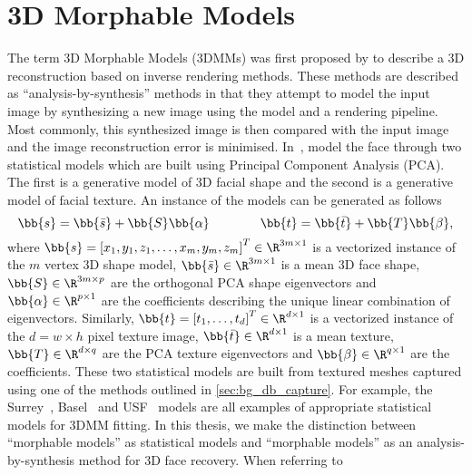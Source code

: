 \section{3D Morphable Models}\label{sec:bg_3dmm}
The term 3D Morphable Models (3DMMs) was first proposed by
\citet{volker1999morphable} to describe a 3D reconstruction based on inverse
rendering methods. These methods are described as ``analysis-by-synthesis''
methods in that they attempt to model the input image by synthesizing a new
image using the model and a rendering pipeline. Most commonly, this synthesized
image is then compared with the input image and the image reconstruction error
is minimised. In~\cite{volker1999morphable}, 
model the face through two statistical models which are built using
Principal Component Analysis (PCA). The first is a generative model of 3D
facial shape and the second is a generative model of facial texture.
An instance of the models can be generated as follows
\begin{equation}\label{eg:bg_3dmm_pca}
	\bb{s} = \bb{\bar{s}} + \bb{S} \bb{\alpha} \qquad \qquad \bb{t} = \bb{\bar{t}} + \bb{T} \bb{\beta},
\end{equation}
where
$\bb{s} = {[x_1, y_1, z_1, \ldots, x_m, y_m, z_m]}^T \in \R^{3m \times 1}$ is
a vectorized instance of the $m$ vertex 3D shape model,
$\bb{\bar{s}} \in \R^{3m \times 1}$ is a mean 3D face shape,
$\bb{S} \in \R^{3m \times p}$ are the orthogonal PCA shape eigenvectors and
$\bb{\alpha} \in \R^{p \times 1}$ are the coefficients describing the unique
linear combination of eigenvectors. Similarly,
$\bb{t} = {[t_1, \ldots, t_d]}^T \in \R^{d \times 1}$ is
a vectorized instance of the $d = w \times h$ pixel texture image,
$\bb{\bar{t}} \in \R^{d \times 1}$ is a mean texture,
$\bb{T} \in \R^{d \times q}$ are the PCA texture eigenvectors and
$\bb{\beta} \in \R^{q \times 1}$ are the coefficients.
These two statistical models are built from textured meshes captured using
one of the methods outlined in \cref{sec:bg_db_capture}. For example,
the Surrey~\cite{Huber:F5Dca9zy}, Basel~\cite{paysan20093d} and
USF~\cite{volker1999morphable} models are all examples of appropriate
statistical models for 3DMM fitting.
In this thesis, we make the distinction between
``morphable models'' as statistical models and ``morphable models'' as an
analysis-by-synthesis method for 3D face recovery. When referring to
